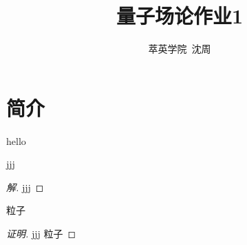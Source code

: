 \documentclass{qftemplate}
\author{萃英学院\ 沈周}
\title{量子场论作业1}
\begin{document}
\maketitle
\section{简介}
hello
\begin{question}[如何正确的输入单位]
    jjj
\end{question}
\begin{proof}[解]
    jjj 
\end{proof}
\begin{question}[宇宙超级无敌粒子]
    粒子    
\end{question}
\begin{proof}[证明]
    jjj 粒子    
\end{proof}
\end{document}

